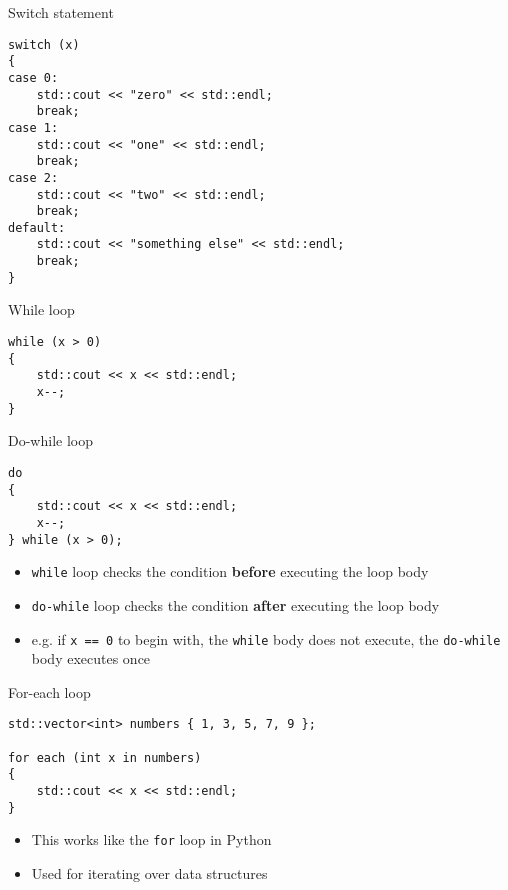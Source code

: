 \begin{frame}[fragile]{Switch statement}
	\begin{lstlisting}
switch (x)
{
case 0:
    std::cout << "zero" << std::endl;
    break;
case 1:
    std::cout << "one" << std::endl;
    break;
case 2:
    std::cout << "two" << std::endl;
    break;
default:
    std::cout << "something else" << std::endl;
    break;
}
	\end{lstlisting}
\end{frame}

\begin{frame}[fragile]{While loop}
	\begin{lstlisting}
while (x > 0)
{
    std::cout << x << std::endl;
    x--;
}
	\end{lstlisting}
\end{frame}

\begin{frame}[fragile]{Do-while loop}
	\begin{lstlisting}
do
{
    std::cout << x << std::endl;
    x--;
} while (x > 0);
	\end{lstlisting}
	\pause
	\begin{itemize}
		\item \lstinline{while} loop checks the condition \textbf{before} executing the loop body \pause
		\item \lstinline{do-while} loop checks the condition \textbf{after} executing the loop body \pause
		\item e.g. if \lstinline{x == 0} to begin with, the \lstinline{while} body does not execute, the \lstinline{do-while} body executes once
	\end{itemize}
\end{frame}

\begin{frame}[fragile]{For-each loop}
	\begin{lstlisting}
std::vector<int> numbers { 1, 3, 5, 7, 9 };

for each (int x in numbers)
{
    std::cout << x << std::endl;
}
	\end{lstlisting}
    \pause
	\begin{itemize}
		\item This works like the \lstinline{for} loop in Python
		\item Used for iterating over data structures
	\end{itemize}
\end{frame}

